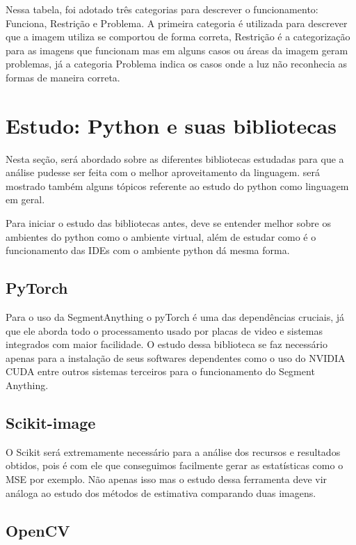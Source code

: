 Nessa tabela, foi adotado três categorias para descrever o funcionamento: Funciona, Restrição e Problema.
A primeira categoria é utilizada para descrever que a imagem utiliza se comportou de forma correta, Restrição é a categorização para as imagens que funcionam mas em alguns casos ou áreas da imagem geram problemas, já a categoria Problema indica os casos onde a luz não reconhecia as formas de maneira correta.

\section{Estudo: Python e suas bibliotecas}
Nesta seção, será abordado sobre as diferentes bibliotecas estudadas para que a análise pudesse ser feita com o melhor aproveitamento da linguagem.
será mostrado também alguns tópicos referente ao estudo do python como linguagem em geral.

Para iniciar o estudo das bibliotecas antes, deve se entender melhor sobre os ambientes do python como o ambiente virtual, além de estudar como é o funcionamento das IDEs com o ambiente python dá mesma forma.


\subsection{PyTorch}

Para o uso da SegmentAnything o pyTorch é uma das dependências cruciais, já que ele aborda todo o processamento usado por placas de video e sistemas integrados com maior facilidade. 
O estudo dessa biblioteca se faz necessário apenas para a instalação de seus softwares dependentes como o uso do NVIDIA CUDA entre outros sistemas terceiros para o funcionamento do Segment Anything.

\subsection{Scikit-image}

O Scikit será extremamente necessário para a análise dos recursos e resultados obtidos, pois é com ele que conseguimos facilmente gerar as estatísticas como o MSE por exemplo.
Não apenas isso mas o estudo dessa ferramenta deve vir análoga ao estudo dos métodos de estimativa comparando duas imagens.

\subsection{OpenCV}

